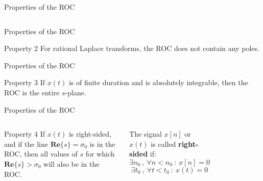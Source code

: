 \documentclass[aspectratio=169]{beamer}
\begin{document}
\begin{frame}{Properties of the ROC}
\begin{columns}
	\end{columns}
\end{frame}

\begin{frame}{Properties of the ROC}
	\begin{block}{Property 2}
		For rational Laplace transforms, the ROC does not contain any poles.
	\end{block}
\end{frame}

\begin{frame}{Properties of the ROC}
	\begin{block}{Property 3}
		If $ x(t) $ is of finite duration and is absolutely integrable, then the ROC is
		the entire $ s $-plane.
	\end{block}
\end{frame}

\begin{frame}{Properties of the ROC}
	\begin{columns}
		\begin{block}{Property 4}
		If $ x(t) $ is right-sided, and if the line $ \mathbf{Re}\{s\}=\sigma_0 $ is in the ROC, then all
values of $ s $ for which $ \mathbf{Re}\{s\}>\sigma_0 $ will also be in the ROC.
	\end{block}
	
	\begin{definition}
		The signal $ x[n] $ or $ x(t) $ is called \textbf{right-sided} if:
		\[\exists n_0 \: , \: \forall n < n_0 \: : \: x[n] = 0\]
		\[\exists t_0 \: , \:\forall t < t_0 \: : \: x(t) = 0\]
	\end{definition}
		
		\begin{figure}[h!]
			\centering
		\end{figure}
		
	\end{columns}

\end{frame}
\end{document}
